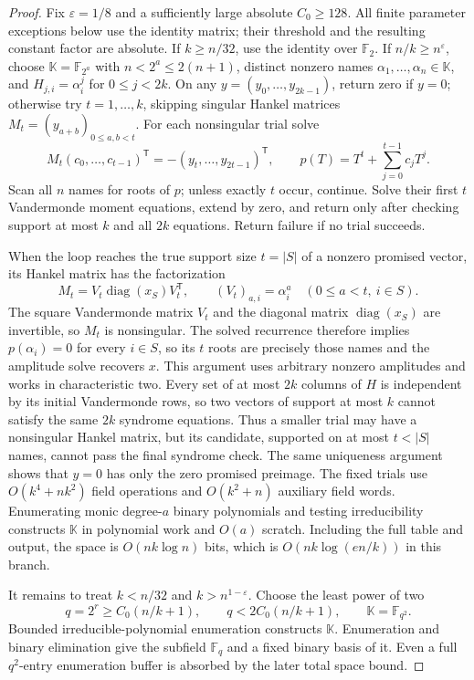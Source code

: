 \documentclass[11pt,letterpaper]{article}
\numberwithin{equation}{section}
\begin{document}
\begin{proof}
Fix $\varepsilon=1/8$ and a sufficiently large absolute $C_0\ge128$.
All finite parameter exceptions below use the identity matrix; their threshold and the resulting constant factor are absolute.
If $k\ge n/32$, use the identity over $\mathbb F_2$.
If $n/k\ge n^\varepsilon$, choose $\mathbb K=\mathbb F_{2^a}$ with $n<2^a\le2(n+1)$, distinct nonzero names $\alpha_1,\ldots,\alpha_n\in \mathbb K$, and $H_{j,i}=\alpha_i^j$ for $0\le j<2k$.
On any $y=(y_0,\ldots,y_{2k-1})$, return zero if $y=0$; otherwise try $t=1,\ldots,k$, skipping singular Hankel matrices $M_t=(y_{a+b})_{0\le a,b<t}$.
For each nonsingular trial solve
\[
 M_t(c_0,\ldots,c_{t-1})^{\mathsf T}
       =-(y_t,\ldots,y_{2t-1})^{\mathsf T},\qquad
 p(T)=T^t+\sum_{j=0}^{t-1}c_jT^j.
\]
Scan all $n$ names for roots of $p$; unless exactly $t$ occur, continue.
Solve their first $t$ Vandermonde moment equations, extend by zero, and return only after checking support at most $k$ and all $2k$ equations.
Return failure if no trial succeeds.

When the loop reaches the true support size $t=|S|$ of a nonzero promised vector, its Hankel matrix has the factorization
\[
 M_t=V_t\operatorname{diag}(x_S)V_t^{\mathsf T},\qquad
 (V_t)_{a,i}=\alpha_i^a\quad(0\le a<t,\ i\in S).
\]
The square Vandermonde matrix $V_t$ and the diagonal matrix $\operatorname{diag}(x_S)$ are invertible, so $M_t$ is nonsingular.
The solved recurrence therefore implies $p(\alpha_i)=0$ for every $i\in S$, so its $t$ roots are precisely those names and the amplitude solve recovers $x$.
This argument uses arbitrary nonzero amplitudes and works in characteristic two.
Every set of at most $2k$ columns of $H$ is independent by its initial Vandermonde rows, so two vectors of support at most $k$ cannot satisfy the same $2k$ syndrome equations.
Thus a smaller trial may have a nonsingular Hankel matrix, but its candidate, supported on at most $t<|S|$ names, cannot pass the final syndrome check.
The same uniqueness argument shows that $y=0$ has only the zero promised preimage.
The fixed trials use $O(k^4+nk^2)$ field operations and $O(k^2+n)$ auxiliary field words.
Enumerating monic degree-$a$ binary polynomials and testing irreducibility constructs $\mathbb K$ in polynomial work and $O(a)$ scratch.
Including the full table and output, the space is $O(nk\log n)$ bits, which is $O(nk\log(en/k))$ in this branch.

It remains to treat $k<n/32$ and $k>n^{1-\varepsilon}$.
Choose the least power of two
\begin{equation}
q=2^r\ge C_0(n/k+1),\qquad q<2C_0(n/k+1),\qquad \mathbb K=\mathbb F_{q^2}.
 \label{eq:b1}
\end{equation}
Bounded irreducible-polynomial enumeration constructs $\mathbb K$.
Enumeration and binary elimination give the subfield $\mathbb F_q$ and a fixed binary basis of it.
Even a full $q^2$-entry enumeration buffer is absorbed by the later total space bound.


\end{proof}
\end{document}
